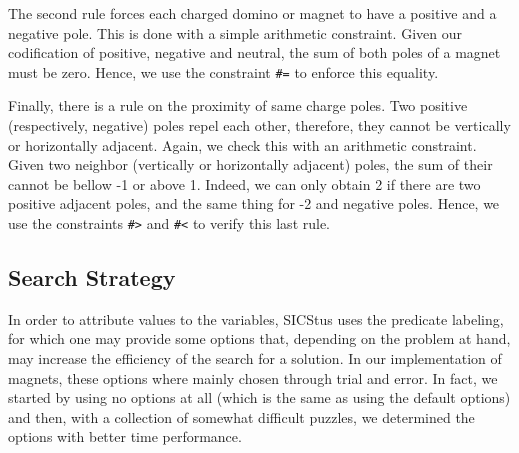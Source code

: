 \documentclass{llncs}
\begin{document}
The second rule forces each charged domino or magnet to have a positive and a negative pole. This is done with a simple arithmetic constraint. Given our codification of positive, negative and neutral, the sum of both poles of a magnet must be zero. Hence, we use the constraint \verb|#=| to enforce this equality.

Finally, there is a rule on the proximity of same charge poles. Two positive (respectively, negative) poles repel each other, therefore, they cannot be vertically or horizontally adjacent. Again, we check this with an arithmetic constraint. Given two neighbor (vertically or horizontally adjacent) poles, the sum of their cannot be bellow -1 or above 1. Indeed, we can only obtain 2 if there are two positive adjacent poles, and the same thing for -2 and negative poles. Hence, we use the constraints \verb|#>| and \verb|#<| to verify this last rule.

\subsection{Search Strategy} 

In order to attribute values to the variables, SICStus uses the predicate labeling, for which one may provide some options that, depending on the problem at hand, may increase the efficiency of the search for a solution. In our implementation of magnets, these options where mainly chosen through trial and error. In fact, we started by using no options at all (which is the same as using the default options) and then, with a collection of somewhat difficult puzzles, we determined the options with better time performance. 
\end{document}
